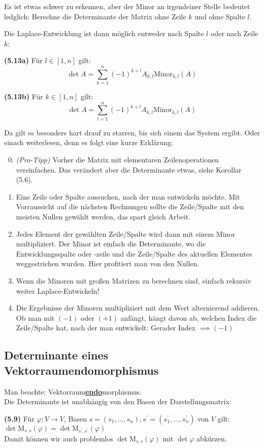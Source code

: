 \documentclass[11pt]{scrartcl}
\newlength{\hangwidth}
\newcommand{\skript}[1]{\settowidth{\hangwidth}{\textbf{(#1)} }\hangpara{\hangwidth}{1}\textbf{(#1)} }
\begin{document}
Es ist etwas schwer zu erkennen, aber der Minor an irgendeiner Stelle bedeutet ledglich: Berechne die Determinante der Matrix ohne Zeile $k$ und ohne Spalte $l$.

Die Laplace-Entwicklung ist dann möglich entweder nach Spalte $l$ oder nach Zeile $k$:

\skript{5.13a} Für $l \in [1,n]$ gilt: \\
$$\det A = \sum_{k=1}^n (-1)^{k+l} A_{k,l} \textrm{Minor}_{k,l}(A)$$

\skript{5.13b} Für $k \in [1,n]$ gilt: \\
$$\det A = \sum_{l=1}^n (-1)^{k+l} A_{k,l} \textrm{Minor}_{k,l}(A)$$

Da gilt es besonders hart drauf zu starren, bis sich einem das System ergibt. Oder einach weiterlesen, denn es folgt eine kurze Erklärung:

\begin{enumerate}
\setcounter{enumi}{-1}
\item \textit{(Pro-Tipp)} Vorher die Matrix mit elementaren Zeilenoperationen vereinfachen. Das verändert aber die Determinante etwas, siehe Korollar (5.6).
\item Eine Zeile oder Spalte aussuchen, nach der man entwickeln möchte. Mit Vorraussicht auf die nächsten Rechnungen sollte die Zeile/Spalte mit den meisten Nullen gewählt werden, das spart gleich Arbeit.
\item Jedes Element der gewählten Zeile/Spalte wird dann mit einem Minor multipliziert. Der Minor ist einfach die Determinante, wo die Entwicklungsspalte oder -zeile und die Zeile/Spalte des aktuellen Elementes weggestrichen wurden. Hier profitiert man von den Nullen.
\item Wenn die Minoren mit großen Matrizen zu berechnen sind, einfach rekursiv weiter Laplace-Entwickeln!
\item Die Ergebnisse der Minoren multipliziert mit dem Wert alternierend addieren. Ob man mit $(-1)$ oder $(+1)$ anfängt, hängt davon ab, welchen Index die Zeile/Spalte hat, nach der man entwickelt: Gerader Index $\implies (-1)$
\end{enumerate}

\subsection{Determinante eines Vektorraumendomorphismus}

Man beachte: Vektorraum\textbf{\underline{endo}}morphismus. \\

Die Determinante ist unabhängig von den Basen der Darstellungsmatrix:

\skript{5.9}Für  $\varphi : V \to V$, Basen $s = (s_1, \ldots, s_n), s^\prime = (s^\prime_1, \ldots, s^\prime_n)$ von $V$ gilt: \\
$\det \textrm{M}_{s,s}(\varphi) = \det \textrm{M}_{s^\prime, s^\prime}(\varphi)$ \\

Damit können wir auch problemlos $\det \textrm{M}_{s,s}(\varphi)$ mit $\det \varphi$ abkürzen.
\end{document}
